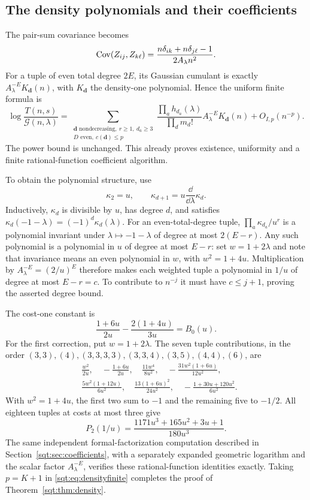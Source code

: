 \subsection{The density polynomials and their coefficients}
The pair-sum covariance becomes
\[
\operatorname{Cov}(Z_{ij},Z_{k\ell})=\frac{n\delta_{ik}+n\delta_{j\ell}-1}{2A_\lambda n^2}.
\]
For a tuple of even total degree $2E$, its Gaussian cumulant is exactly $A_\lambda^{-E}K_{\boldsymbol d}(n)$, with $K_{\boldsymbol d}$ the density-one polynomial. Hence the uniform finite formula is
\begin{equation}\label{sqt:eq:densityfinite}
\log\frac{T(n,s)}{\mathcal G(n,\lambda)}
 =\sum_{\substack{\boldsymbol d\text{ nondecreasing},\ r\geq1,\ d_a\geq3\\
                    D\text{ even},\ c(\boldsymbol d)\leq p}}
 \frac{\prod_a h_{d_a}(\lambda)}{\prod_d m_d!}
 A_\lambda^{-E}K_{\boldsymbol d}(n)+O_{I,p}(n^{-p}).
\end{equation}
The power bound is unchanged. This already proves existence, uniformity and a finite rational-function coefficient algorithm.

To obtain the polynomial structure, use
\[
\kappa_2=u,\qquad \kappa_{d+1}=u\frac{\dd}{\dd\lambda}\kappa_d.
\]
Inductively, $\kappa_d$ is divisible by $u$, has degree $d$, and satisfies
$\kappa_d(-1-\lambda)=(-1)^d\kappa_d(\lambda)$. For an even-total-degree tuple,
$\prod_a\kappa_{d_a}/u^r$ is a polynomial invariant under $\lambda\mapsto-1-\lambda$ of degree at most $2(E-r)$. Any such polynomial is a polynomial in $u$ of degree at most $E-r$: set $w=1+2\lambda$ and note that invariance means an even polynomial in $w$, with $w^2=1+4u$. Multiplication by $A_\lambda^{-E}=(2/u)^E$ therefore makes each weighted tuple a polynomial in $1/u$ of degree at most $E-r=c$. To contribute to $n^{-j}$ it must have $c\leq j+1$, proving the asserted degree bound.

The cost-one constant is
\[
\frac{1+6u}{2u}-\frac{2(1+4u)}{3u}=B_0(u).
\]
For the first correction, put $w=1+2\lambda$. The seven tuple contributions, in the order $(3,3),(4),(3,3,3,3),(3,3,4),(3,5),(4,4),(6)$, are
\begin{align*}
&\frac{w^2}{2u},\quad-\frac{1+6u}{2u},\quad
\frac{11w^4}{8u^2},\quad-\frac{31w^2(1+6u)}{12u^2},\\
&\frac{5w^2(1+12u)}{6u^2},\quad
\frac{13(1+6u)^2}{24u^2},\quad-\frac{1+30u+120u^2}{6u^2}.
\end{align*}
With $w^2=1+4u$, the first two sum to $-1$ and the remaining five to $-1/2$. All eighteen tuples at costs at most three give
\[
P_2(1/u)=\frac{1171u^3+165u^2+3u+1}{180u^3}.
\]
The same independent formal-factorization computation described in Section~\ref{sqt:sec:coefficients}, with a separately expanded geometric logarithm and the scalar factor $A_\lambda^{-E}$, verifies these rational-function identities exactly. Taking $p=K+1$ in \eqref{sqt:eq:densityfinite} completes the proof of Theorem~\ref{sqt:thm:density}.

